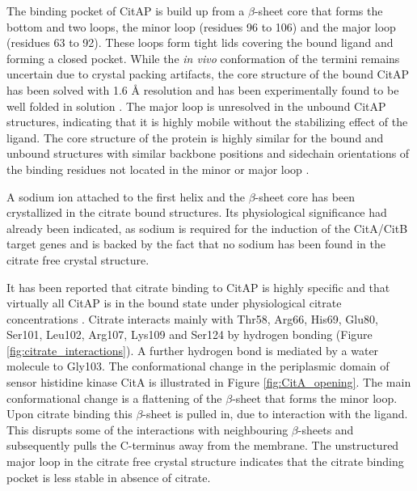 \documentclass[english, a4paper, 12pt, titlepage, draft]{article}
\begin{document}
The binding pocket of CitAP is build up from a $\beta$-sheet core that forms the bottom and two loops, the minor loop (residues 96 to 106) and the major loop (residues 63 to 92).
These loops form tight lids covering the bound ligand and forming a closed pocket.
While the \textit{in vivo} conformation of the termini remains uncertain due to crystal packing artifacts, the core structure of the bound CitAP has been solved with 1.6 \r{A} resolution and has been experimentally found to be well folded in solution \cite{CitA_2J80}.
The major loop is unresolved in the unbound CitAP structures, indicating that it is highly mobile without the stabilizing effect of the ligand.
The core structure of the protein is highly similar for the bound and unbound structures with similar backbone positions and sidechain orientations of the binding residues not located in the minor or major loop \cite{CitA_2J80}.

A sodium ion attached to the first helix and the $\beta$-sheet core has been crystallized in the citrate bound structures.
Its physiological significance had already been indicated, as sodium is required for the induction of the CitA/CitB target genes \cite{KlebsiellaMetabolism} and is backed by the fact that no sodium has been found in the citrate free crystal structure.

It has been reported that citrate binding to CitAP is highly specific and that virtually all CitAP is in the bound state under physiological citrate concentrations \cite{CitA_2J80}.
Citrate interacts mainly with Thr58, Arg66, His69, Glu80, Ser101, Leu102, Arg107, Lys109 and Ser124 by hydrogen bonding (Figure \ref{fig:citrate_interactions}).
A further hydrogen bond is mediated by a water molecule to Gly103.
The conformational change in the periplasmic domain of sensor histidine kinase CitA is illustrated in Figure \ref{fig:CitA_opening}.
The main conformational change is a flattening of the $\beta$-sheet that forms the minor loop.
Upon citrate binding this $\beta$-sheet is pulled in, due to interaction with the ligand.
This disrupts some of the interactions with neighbouring $\beta$-sheets and subsequently pulls the C-terminus away from the membrane.
The unstructured major loop in the citrate free crystal structure indicates that the citrate binding pocket is less stable in absence of citrate.
\end{document}
